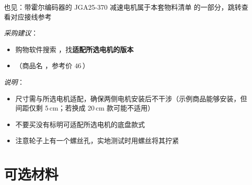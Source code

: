 \documentclass[11pt,a4paper]{article}
\begin{document}
\begin{seealso}
  也见：带霍尔编码器的 JGA25-370 减速电机属于本套物料清单  的一部分，跳转查看对应接线参考
\end{seealso}

\label{pt:chassis}

\emph{采购建议}：

\begin{itemize}
  \item 购物软件搜索 ，找\textbf{适配所选电机的版本}
  \item {}（商品名 ，参考价 $46$\,\yuan）
\end{itemize}

\emph{说明}：

\begin{itemize}
  \item 尺寸需与所选电机适配，确保两侧电机安装后不干涉（示例商品能够安装，但间距仅剩 5\,cm；若换成 20\,cm 款可能不适用）


  \item 不要买没有标明可适配所选电机的底盘款式
  \item 注意轮子上有一个螺丝孔，实地测试时用螺丝将其拧紧
\end{itemize}

\newpage
\section{可选材料}\label{sec:optional}
\end{document}
